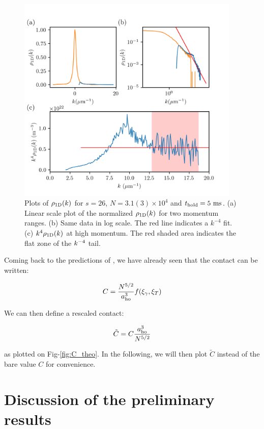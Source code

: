\begin{figure}
    \centering
    \includegraphics[width=0.95\textwidth]{Fig/Chapter5/1D_plots.png}
    \caption{Plots of $\rho_{\rm{1D}}(k)$ for $s=26$, $N=3.1(3) \times 10^4$ and $t_{\rm{hold}}=5 \ \rm{ms}$. (a) Linear scale plot of the normalized $\rho_{\rm{1D}}(k)$ for two momentum ranges. (b) Same data in log scale. The red line indicates a $k^{-4}$ fit. (c) $k^4 \rho_{\rm{1D}} (k)$ at high momentum. The red shaded area indicates the flat zone of the $k^{-4}$ tail.}
    \label{fig:1D_plots}
\end{figure}

Coming back to the predictions of \cite{yao2018tan}, we have already seen that the contact can be written:

\begin{equation}
    C= \frac{N^{5/2}}{a_{\rm{ho}}^3} f(\xi_{\gamma},\xi_{T})
\end{equation}

\noindent We can then define a rescaled contact:

\begin{equation}
    \tilde{C}=C \frac{a_{\rm{ho}}^3}{N^{5/2}}
\end{equation}

\noindent as plotted on Fig-\ref{fig:C_theo}. In the following, we will then plot $\tilde{C}$ instead of the bare value $C$ for convenience.


\section{Discussion of the preliminary results}

